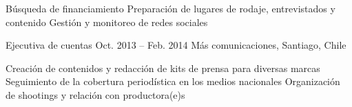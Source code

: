 \begin{joblist}
{		\iftbftiny \vspace{-0.5cm} \fi
			\begin{itemize}
			  \iftbftiny \setlength\itemsep{-3pt} \fi
			  \cvitem[\checkmark] Búsqueda de financiamiento                
			  \cvitem[\checkmark] Preparación de lugares de rodaje, entrevistados y contenido
			  \cvitem[\checkmark] Gestión y monitoreo de redes sociales      
			\end{itemize}     
			
	}



\item[Ejecutiva de cuentas]{Oct. 2013 -- Feb. 2014 }     
  	{
  	Más comunicaciones, Santiago, Chile
  	}     
  	{

		\iftbftiny \vspace{-0.5cm} \fi
		\begin{itemize}
			  \iftbftiny \setlength\itemsep{-3pt} \fi
			  \cvitem[\checkmark]  Creación de contenidos y redacción de kits de prensa para diversas marcas                                       
			  \cvitem[\checkmark]  Seguimiento de la cobertura periodística en los medios nacionales                                          
			  \cvitem[\checkmark]  Organización de shootings y relación con productora(e)s

		\end{itemize}       
	}



   

\end{joblist}


%
%


